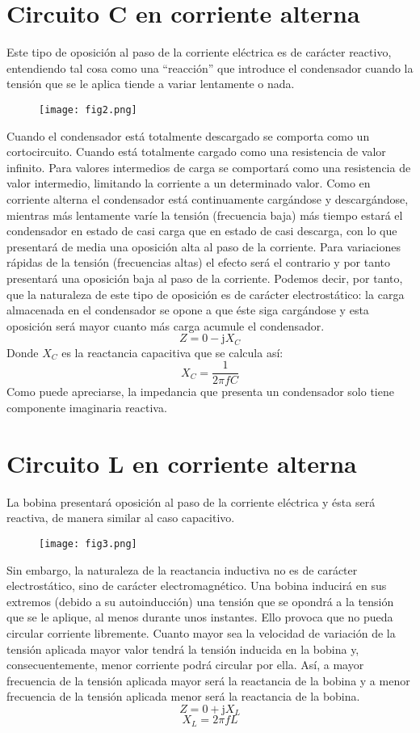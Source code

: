 \documentclass[a4paper,12pt]{report}
\begin{document}
\section{Circuito C en corriente alterna}
Este tipo de oposición al paso de la corriente eléctrica es de carácter reactivo, entendiendo tal cosa como una ``reacción''  que  introduce  el  condensador  cuando  la  tensión  que  se  le  aplica  tiende  a  variar  lentamente  o  nada. 
\begin{figure}[H]
\centering
\texttt{[image: fig2.png]}
\end{figure}
Cuando el condensador está totalmente descargado se comporta como un cortocircuito. Cuando está totalmente cargado  como  una  resistencia  de  valor  infinito.  Para  valores  intermedios  de  carga  se  comportará  como  una  resistencia  de  valor  intermedio,  limitando  la  corriente  a  un  determinado  valor.  Como  en  corriente  alterna  el  condensador  está  continuamente  cargándose  y  descargándose,  mientras  más  lentamente  varíe  la  tensión  (frecuencia baja) más tiempo estará el condensador en estado de casi carga que en estado de casi descarga, con lo que  presentará  de  media  una  oposición  alta  al  paso  de  la  corriente.  Para  variaciones  rápidas  de  la  tensión  (frecuencias  altas)  el  efecto  será  el  contrario  y  por  tanto  presentará  una  oposición  baja  al  paso  de  la  corriente.  Podemos  decir,  por  tanto,  que  la  naturaleza  de  este  tipo  de  oposición  es  de  carácter  electrostático:  la  carga  almacenada en el condensador se opone a que éste siga cargándose y esta oposición será mayor cuanto más carga acumule el condensador.
$$
Z = 0 - \mathrm{j}X_{C}
$$
Donde $X_{C}$ es la reactancia capacitiva que se calcula así:
$$
X_{C} = \frac{1}{2\pi f C}
$$
Como puede apreciarse, la impedancia que presenta un condensador solo tiene componente imaginaria reactiva.
\section{Circuito L en corriente alterna}
La  bobina  presentará  oposición  al  paso  de  la  corriente  eléctrica  y  ésta  será  reactiva,  de  manera  similar  al  caso  capacitivo.
\begin{figure}[H]
\centering
\texttt{[image: fig3.png]}
\end{figure}
Sin  embargo,  la  naturaleza  de  la  reactancia  inductiva  no  es  de  carácter  electrostático,  sino  de  carácter electromagnético. Una bobina inducirá en sus extremos (debido a su autoinducción) una tensión que se opondrá  a  la  tensión  que  se  le  aplique,  al  menos  durante  unos  instantes.  Ello  provoca  que  no  pueda  circular  corriente  libremente.  Cuanto  mayor  sea  la  velocidad  de  variación  de  la  tensión  aplicada  mayor  valor  tendrá  la  tensión  inducida  en  la  bobina  y,  consecuentemente,  menor  corriente  podrá  circular  por  ella.  Así,  a  mayor  frecuencia  de  la  tensión  aplicada  mayor  será  la  reactancia  de  la  bobina  y  a  menor  frecuencia  de  la  tensión  aplicada menor será la reactancia de la bobina.
$$
Z = 0 + \mathrm{j}X_{L}
$$
$$
X_{L} = 2\pi f L
$$
\end{document}
